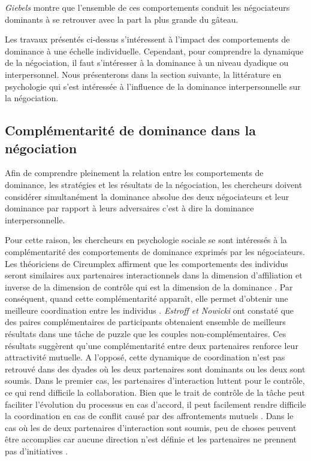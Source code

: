 	\emph{Giebels} \cite{giebels2000interdependence} montre que l'ensemble de ces comportements conduit les négociateurs dominants à se retrouver avec la part la plus grande du gâteau.
	
	Les travaux présentés ci-dessus s'intéressent à l'impact des comportements de dominance à une échelle individuelle. Cependant, pour comprendre la dynamique de la négociation, il faut s'intéresser à la dominance à un niveau dyadique ou interpersonnel. 
	Nous présenterons dans la section suivante, la littérature en psychologie qui s'est intéressée à l'influence de la dominance interpersonnelle sur la négociation. 

	\subsection{Complémentarité de dominance dans la négociation}
	\label{sec:compEtat}
	Afin de comprendre pleinement la relation entre les comportements de dominance, les stratégies et les résultats de la négociation, les chercheurs doivent considérer simultanément la dominance absolue des deux négociateurs et leur dominance par rapport à leurs adversaires c'est à dire la dominance interpersonnelle. 
	
	Pour cette raison, les chercheurs en psychologie sociale se sont intéressés à la complémentarité des comportements de dominance exprimés par les négociateurs. 
	Les théoriciens de Circumplex affirment que les comportements des individus seront similaires aux partenaires interactionnels dans la dimension d'affiliation et inverse  de la dimension de contrôle qui est la dimension de la dominance \cite{tiedens2003power}.
	Par conséquent, quand cette complémentarité apparaît, elle permet d'obtenir une meilleure coordination entre les individus \cite{wiltermuth2015benefits}. \emph{Estroff et Nowicki} \cite{estroff1992interpersonal} ont constaté que des paires complémentaires de participants obtenaient ensemble de meilleurs résultats dans une tâche de puzzle que les couples non-complémentaires. Ces résultats suggèrent qu'une complémentarité entre deux partenaires renforce leur attractivité mutuelle.
	A l'opposé, cette dynamique de coordination n'est pas retrouvé dans des dyades où les deux partenaires sont dominants ou les deux sont soumis. 
	Dans le premier cas, les partenaires d'interaction luttent pour le contrôle, ce qui rend difficile la collaboration. Bien que le trait de contrôle de la tâche peut faciliter l'évolution du processus en cas d'accord, il peut facilement rendre difficile la coordination en cas de conflit causé par des affrontements mutuels \cite{wiltermuth2015benefits}. Dans le cas où les de deux partenaires d'interaction sont soumis, peu de choses peuvent être accomplies car aucune direction n'est définie et les partenaires ne prennent pas d'initiatives \cite{wiltermuth2015benefits}.
	 
